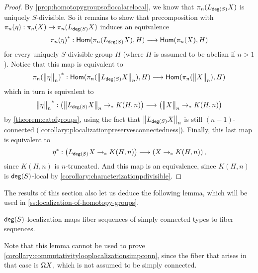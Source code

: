 \begin{proof}
    By \cref{prop:homotopygroupsoflocalarelocal},
    we know that $\pi_n(L_{\degg(S)} X)$ is uniquely $S$-divisible.
    So it remains to show that precomposition with $\pi_n(\eta) : \pi_n(X) \to \pi_n(L_{\degg(S)} X)$
    induces an equivalence
    \[
        \precomp{\pi_n(\eta)} : \Hom(\pi_n(L_{\degg(S)} X),  H) \lra \Hom(\pi_n(X), H)
    \]
    for every uniquely $S$-divisible group $H$ (where $H$ is assumed to be abelian if $n>1$).
    Notice that this map is equivalent to 
    \[
        \precomp{\pi_n(\ttrunc{n}{\eta})} : \Hom(\pi_n(\ttrunc{n}{L_{\degg(S)} X}),  H) \lra \Hom(\pi_n(\ttrunc{n}{X}), H)
    \]
    which in turn is equivalent to
    \[
        \precomp{\ttrunc{n}{\eta}} : \left( \ttrunc{n}{L_{\degg(S)}X} \pto K(H, n) \right) \lra \left( \ttrunc{n}{X} \pto K(H, n) \right) 
    \]
    by \cref{theorem:catofgroups}, using the fact that $\ttrunc{n}{L_{\degg(S)}X}$ is still $(n-1)$-connected (\cref{corollary:plocalizationpreservesconnectedness}).
    Finally, this last map is equivalent to
    \[
        \precomp{\eta} : \left( L_{\degg(S)}X \pto K(H, n) \right) \lra \left( X \pto K(H, n) \right),
    \]
    since $K(H,n)$ is $n$-truncated.
    And this map is an equivalence, since $K(H,n)$ is $\degg(S)$-local by \cref{corollary:characterizationpdivisible}.
\end{proof}

The results of this section also let us deduce the following lemma,
which will be used in \cref{ss:localization-of-homotopy-groups}.

\begin{lem}\label{lemma:lex}
    $\degg(S)$-localization maps fiber sequences of simply connected types to fiber sequences.
\end{lem}

Note that this lemma cannot be used to prove \cref{corollary:commutativitylooplocalizationsimpconn},
since the fiber that arises in that case is $\loopspacesym X$, which is not assumed to be
simply connected.

